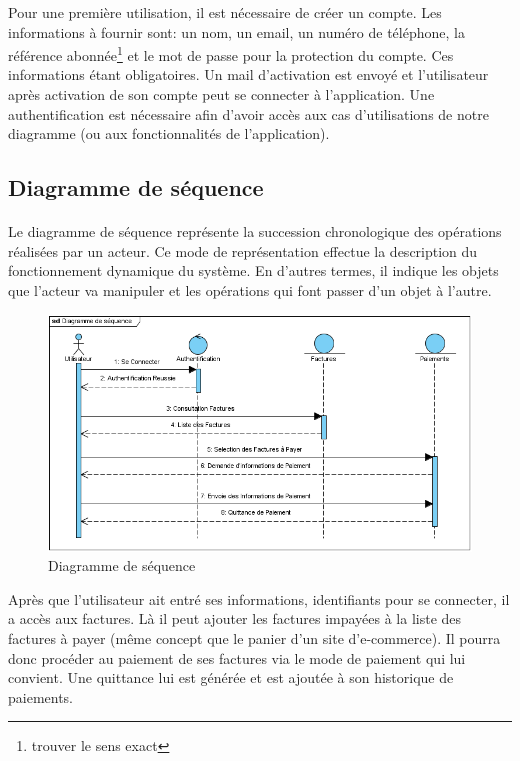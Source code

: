 	  Pour une premi\`ere utilisation, il est n\'ecessaire de cr\'eer un compte. Les informations \`a fournir sont: un nom, un email, un num\'ero de t\'el\'ephone, la r\'ef\'erence abonn\'ee\footnote{trouver le sens exact} et le mot de passe pour la protection du compte. Ces informations \'etant obligatoires. Un mail d'activation est envoy\'e et l'utilisateur apr\`es activation de son compte peut se connecter \`a l'application. Une authentification est nécessaire afin d'avoir acc\`es aux cas d'utilisations de notre diagramme (ou aux fonctionnalités de l'application).
	  
\subsection{Diagramme de séquence}
 \paragraph{}
	  Le diagramme de séquence représente la succession chronologique des opérations réalisées par un acteur. Ce mode de représentation effectue la description du fonctionnement dynamique du système. En d'autres termes, il indique les objets que l'acteur va manipuler et les opérations qui font passer d'un objet à l'autre.
	  \begin{figure}[H]
		     \begin{center}
			\includegraphics[scale=0.6]{images/sd.png}
		     \end{center}
		     \caption{Diagramme de séquence}
		     \label{Diagramme de cas d'utilisation}
	  \end{figure}
	  Après que l'utilisateur ait entré ses informations, identifiants pour se connecter, il a acc\`es aux factures. L\`a il peut ajouter les factures impay\'ees \`a la liste des factures \`a payer (m\^eme concept que le panier d'un site d'e-commerce). Il pourra donc proc\'eder au paiement de ses factures via le mode de paiement qui lui convient. Une quittance lui est g\'en\'er\'ee et est ajout\'ee \`a son historique de paiements.